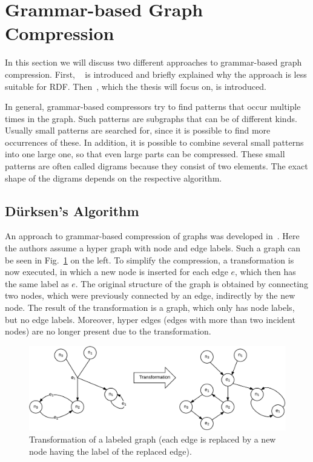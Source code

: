 \section{Grammar-based Graph Compression}\label{related_work_grammar_based}

In this section we will discuss two different approaches to grammar-based graph compression. First, ~\cite{mattdk} is introduced and briefly explained why the approach is less suitable for RDF. Then~\cite{maneth}, which the thesis will focus on, is introduced.

In general, grammar-based compressors try to find patterns that occur multiple times in the graph. Such patterns are subgraphs that can be of different kinds. Usually small patterns are searched for, since it is possible to find more occurrences of these. In addition, it is possible to combine several small patterns into one large one, so that even large parts can be compressed. These small patterns are often called digrams because they consist of two elements. The exact shape of the digrams depends on the respective algorithm.

\subsection{Dürksen's Algorithm}

An approach to grammar-based compression of graphs was developed in~\cite{mattdk}. Here the authors assume a hyper graph with node and edge labels. Such a graph can be seen in Fig.~\ref{fig:transformation} on the left. To simplify the compression, a transformation is now executed, in which a new node is inserted for each edge $e$, which then has the same label as $e$. The original structure of the graph is obtained by connecting two nodes, which were previously connected by an edge, indirectly by the new node. The result of the transformation is a graph, which only has node labels, but no edge labels. Moreover, hyper edges (edges with more than two incident nodes) are no longer present due to the transformation.

\begin{figure}[h]
	\centering
	\includegraphics[width=1\textwidth]{figures/relatedwork/transf}
	\caption{Transformation of a labeled graph (each edge is replaced by a new node having the label of the replaced edge).}
	\label{fig:transformation}
\end{figure}

